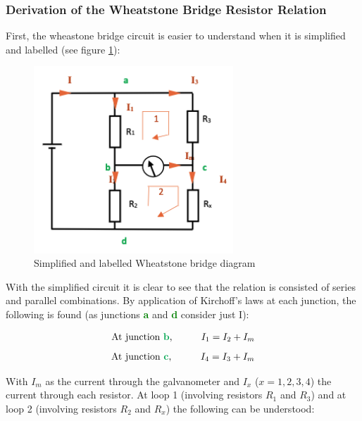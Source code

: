 \documentclass[12pt]{article}
\begin{document}
\subsubsection{Derivation of the Wheatstone Bridge Resistor Relation}

First, the wheastone bridge circuit is easier to understand when it is simplified and labelled (see figure \ref{fig:simplewheat}):

\begin{figure}[H]
    \centering
    \includegraphics[width=7.5cm]{simplified wheat diagram.png}
    \caption{\centering Simplified and labelled Wheatstone bridge diagram \protect\cite{PHYC20090ass1sol}}
    \label{fig:simplewheat}
\end{figure}

With the simplified circuit it is clear to see that the relation is consisted of series and parallel combinations. By application of Kirchoff's laws at each
junction, the following is found (as junctions \textbf{\textcolor{Green}{a}} and \textbf{\textcolor{Green}{d}} consider just I):

\vspace{-2ex}
\begin{gather} \label{eq:1}
    \text{At junction \textbf{\textcolor{Green}{b}},} \qquad\quad I_1 = I_2 + I_m
\end{gather}
\vspace{-5ex}
\begin{gather} \label{eq:2}
    \text{At junction \textbf{\textcolor{Green}{c}},} \qquad\quad I_4 = I_3 + I_m
\end{gather}

With $I_m$ as the current through the galvanometer and $I_x$ ($x=1,2,3,4$) the current through each resistor. 
At loop 1 (involving resistors $R_1$ and $R_3$) and at loop 2 (involving resistors $R_2$ and $R_x$) the following can be understood:
\end{document}
